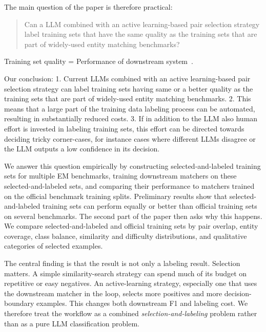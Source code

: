 The main question of the paper is therefore practical:


\begin{quote}
Can a LLM combined with an active learning-based pair selection strategy label training sets that have the same quality as the training sets that are part of widely-used entity matching benchmarks?
\end{quote}

Training set quality = Performance of downstream system~\cite{FelixDataQualityandML2025}.

Our conclusion: 
1. Current LLMs combined with an active learning-based pair selection strategy can label training sets having same or a better quality as the training sets that are part of widely-used entity matching benchmarks.
2. This means that a large part of the training data labeling process can be automated, resulting in substantially reduced costs. 
3. If in addition to the LLM also human effort is invested in labeling training sets, this effort can be directed towards deciding tricky corner-cases, for instance cases where different LLMs disagree or the LLM outputs a low confidence in its decision.


We answer this question empirically by constructing selected-and-labeled training sets for multiple EM benchmarks, training downstream matchers on these selected-and-labeled sets, and comparing their performance to matchers trained on the official benchmark training splits. Preliminary results show that selected-and-labeled training sets can perform equally or better than official training sets on several benchmarks. The second part of the paper then asks why this happens. We compare selected-and-labeled and official training sets by pair overlap, entity coverage, class balance, similarity and difficulty distributions, and qualitative categories of selected examples.

The central finding is that the result is not only a labeling result. Selection matters. A simple similarity-search strategy can spend much of its budget on repetitive or easy negatives. An active-learning strategy, especially one that uses the downstream matcher in the loop, selects more positives and more decision-boundary examples. This changes both downstream F1 and labeling cost. We therefore treat the workflow as a combined \emph{selection-and-labeling} problem rather than as a pure LLM classification problem.

